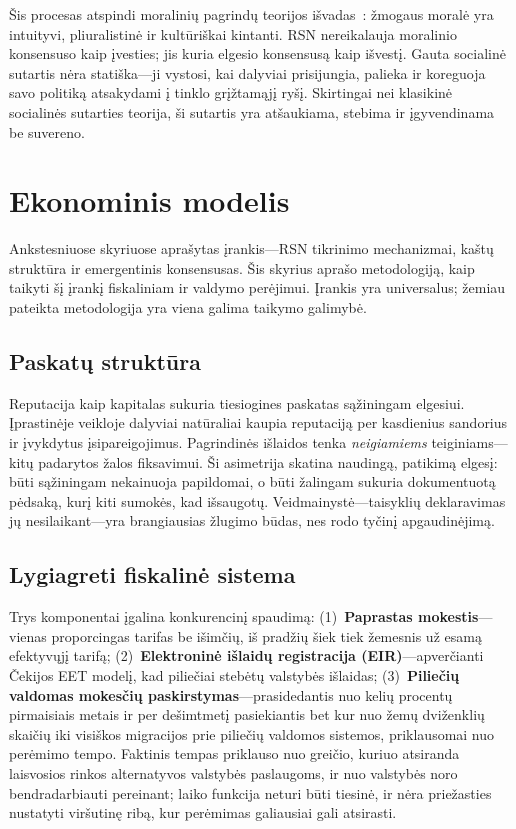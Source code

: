 \documentclass[11pt,a4paper,twocolumn]{article}
\begin{document}
Šis procesas atspindi moralinių pagrindų teorijos išvadas~\cite{haidt2012}: žmogaus moralė yra intuityvi, pliuralistinė ir kultūriškai kintanti. RSN nereikalauja moralinio konsensuso kaip įvesties; jis kuria elgesio konsensusą kaip išvestį. Gauta socialinė sutartis nėra statiška---ji vystosi, kai dalyviai prisijungia, palieka ir koreguoja savo politiką atsakydami į tinklo grįžtamąjį ryšį. Skirtingai nei klasikinė socialinės sutarties teorija, ši sutartis yra atšaukiama, stebima ir įgyvendinama be suvereno.

\section{Ekonominis modelis}

Ankstesniuose skyriuose aprašytas įrankis---RSN tikrinimo mechanizmai, kaštų struktūra ir emergentinis konsensusas. Šis skyrius aprašo metodologiją, kaip taikyti šį įrankį fiskaliniam ir valdymo perėjimui. Įrankis yra universalus; žemiau pateikta metodologija yra viena galima taikymo galimybė.

\subsection{Paskatų struktūra}

Reputacija kaip kapitalas sukuria tiesiogines paskatas sąžiningam elgesiui. Įprastinėje veikloje dalyviai natūraliai kaupia reputaciją per kasdienius sandorius ir įvykdytus įsipareigojimus. Pagrindinės išlaidos tenka \emph{neigiamiems} teiginiams---kitų padarytos žalos fiksavimui. Ši asimetrija skatina naudingą, patikimą elgesį: būti sąžiningam nekainuoja papildomai, o būti žalingam sukuria dokumentuotą pėdsaką, kurį kiti sumokės, kad išsaugotų. Veidmainystė---taisyklių deklaravimas jų nesilaikant---yra brangiausias žlugimo būdas, nes rodo tyčinį apgaudinėjimą.

\subsection{Lygiagreti fiskalinė sistema}

Trys komponentai įgalina konkurencinį spaudimą: (1)~\textbf{Paprastas mokestis}---vienas proporcingas tarifas be išimčių, iš pradžių šiek tiek žemesnis už esamą efektyvųjį tarifą; (2)~\textbf{Elektroninė išlaidų registracija (EIR)}---apverčianti Čekijos EET modelį, kad piliečiai stebėtų valstybės išlaidas; (3)~\textbf{Piliečių valdomas mokesčių paskirstymas}---prasidedantis nuo kelių procentų pirmaisiais metais ir per dešimtmetį pasiekiantis bet kur nuo žemų dviženklių skaičių iki visiškos migracijos prie piliečių valdomos sistemos, priklausomai nuo perėmimo tempo. Faktinis tempas priklauso nuo greičio, kuriuo atsiranda laisvosios rinkos alternatyvos valstybės paslaugoms, ir nuo valstybės noro bendradarbiauti pereinant; laiko funkcija neturi būti tiesinė, ir nėra priežasties nustatyti viršutinę ribą, kur perėmimas galiausiai gali atsirasti.
\end{document}
